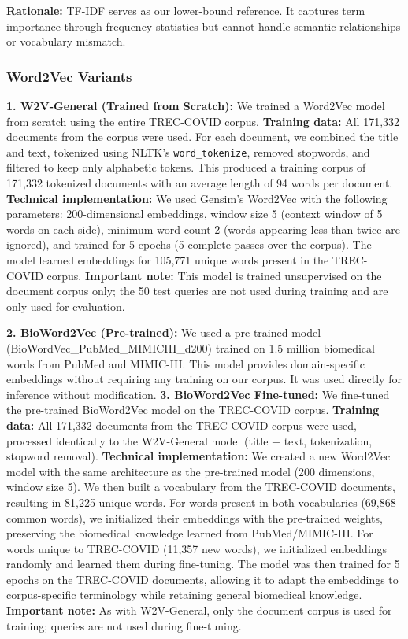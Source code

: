 \documentclass[sigconf,nonacm]{acmart}
\begin{document}
\textbf{Rationale:} TF-IDF serves as our lower-bound reference. It captures term importance through frequency statistics but cannot handle semantic relationships or vocabulary mismatch.

\subsubsection{Word2Vec Variants}

\textbf{1. W2V-General (Trained from Scratch):} We trained a Word2Vec model from scratch using the entire TREC-COVID corpus. \textbf{Training data:} All 171,332 documents from the corpus were used. For each document, we combined the title and text, tokenized using NLTK's \texttt{word\_tokenize}, removed stopwords, and filtered to keep only alphabetic tokens. This produced a training corpus of 171,332 tokenized documents with an average length of 94 words per document. \textbf{Technical implementation:} We used Gensim's Word2Vec with the following parameters: 200-dimensional embeddings, window size 5 (context window of 5 words on each side), minimum word count 2 (words appearing less than twice are ignored), and trained for 5 epochs (5 complete passes over the corpus). The model learned embeddings for 105,771 unique words present in the TREC-COVID corpus. \textbf{Important note:} This model is trained unsupervised on the document corpus only; the 50 test queries are not used during training and are only used for evaluation.

\textbf{2. BioWord2Vec (Pre-trained):} We used a pre-trained model (BioWordVec\_PubMed\_MIMICIII\_d200) trained on 1.5 million biomedical words from PubMed and MIMIC-III. This model provides domain-specific embeddings without requiring any training on our corpus. It was used directly for inference without modification.
\textbf{3. BioWord2Vec Fine-tuned:} We fine-tuned the pre-trained BioWord2Vec model on the TREC-COVID corpus. \textbf{Training data:} All 171,332 documents from the TREC-COVID corpus were used, processed identically to the W2V-General model (title + text, tokenization, stopword removal). \textbf{Technical implementation:} We created a new Word2Vec model with the same architecture as the pre-trained model (200 dimensions, window size 5). We then built a vocabulary from the TREC-COVID documents, resulting in 81,225 unique words. For words present in both vocabularies (69,868 common words), we initialized their embeddings with the pre-trained weights, preserving the biomedical knowledge learned from PubMed/MIMIC-III. For words unique to TREC-COVID (11,357 new words), we initialized embeddings randomly and learned them during fine-tuning. The model was then trained for 5 epochs on the TREC-COVID documents, allowing it to adapt the embeddings to corpus-specific terminology while retaining general biomedical knowledge. \textbf{Important note:} As with W2V-General, only the document corpus is used for training; queries are not used during fine-tuning.
\end{document}
